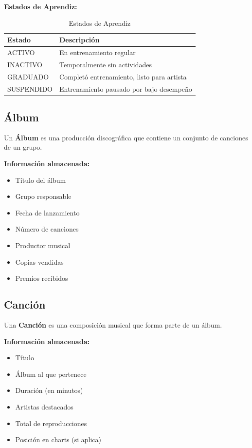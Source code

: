 \documentclass[12pt,a4paper,spanish,oneside]{report}
\begin{document}
\textbf{Estados de Aprendiz:}
\begin{table}[H]
\centering
\caption{Estados de Aprendiz}
\begin{tabular}{|l|p{7cm}|}
\hline
\textbf{Estado} & \textbf{Descripción} \\
\hline
ACTIVO & En entrenamiento regular \\
\hline
INACTIVO & Temporalmente sin actividades \\
\hline
GRADUADO & Completó entrenamiento, listo para artista \\
\hline
SUSPENDIDO & Entrenamiento pausado por bajo desempeño \\
\hline
\end{tabular}
\end{table}

\subsection{Álbum}

Un \textbf{Álbum} es una producción discográfica que contiene un conjunto de canciones de un grupo.

\textbf{Información almacenada:}
\begin{itemize}
\item Título del álbum
\item Grupo responsable
\item Fecha de lanzamiento
\item Número de canciones
\item Productor musical
\item Copias vendidas
\item Premios recibidos
\end{itemize}

\subsection{Canción}

Una \textbf{Canción} es una composición musical que forma parte de un álbum.

\textbf{Información almacenada:}
\begin{itemize}
\item Título
\item Álbum al que pertenece
\item Duración (en minutos)
\item Artistas destacados
\item Total de reproducciones
\item Posición en charts (si aplica)
\end{itemize}
\end{document}
